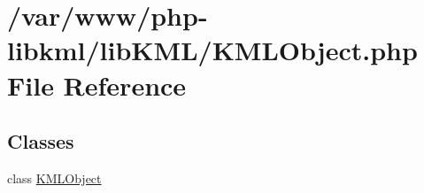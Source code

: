 \hypertarget{KMLObject_8php}{
\section{/var/www/php-\/libkml/libKML/KMLObject.php File Reference}
\label{da/de3/KMLObject_8php}
}
\subsection*{Classes}
\begin{DoxyCompactItemize}
\item 
class \hyperlink{classKMLObject}{KMLObject}
\end{DoxyCompactItemize}
